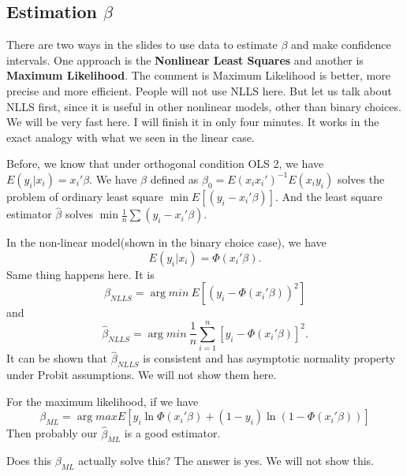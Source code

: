 \documentclass[11pt,a4paper]{amsart}
\theoremstyle{plain}
\theoremstyle{definition}
\begin{document}
\subsection{Estimation $\beta$}
	There are two ways in the slides to use data to estimate $\beta$ and make confidence intervals. One approach is the \textbf{Nonlinear Least Squares} and another is \textbf{Maximum Likelihood}. The comment is Maximum Likelihood is better, more precise and more efficient. People will not use NLLS here. But let us talk about NLLS first, since it is useful in other nonlinear models, other than binary choices. We will be very fast here. I will finish it in only four minutes. It works in the exact analogy with what we seen in the linear case.\par 
	Before, we know that under orthogonal condition OLS 2, we have $E(y_{i}|x_{i}) = x_{i}'\beta$. We have $\beta$ defined as $\beta_{0} = E(x_{i}x_{i}')^{-1}E(x_{i}y_{i})$ solves the problem of ordinary least square 
	$\min E[(y_{i} - x_{i}'\beta)]$. And the least square estimator $\hat{\beta}$ solves $\min \frac{1}{n}\sum(y_{i} - x_{i}'\beta)$. \par 
	In the non-linear model(shown in the binary choice case), we have 
	\[	E(y_{i}|x_{i}) = \Phi(x_{i}'\beta).	\] 
	Same thing happens here. It is 
	\[	\beta_{NLLS} = \arg min ~ E[(y_{i}-\Phi(x_{i}'\beta))^{2}]	\]
	and
	\[	\hat{\beta}_{NLLS} = \arg min ~ \frac{1}{n}\sum_{i=1}^{n}[y_{i}-\Phi(x_{i}'\beta)]^{2}.	\]
	It can be shown that $\hat{\beta}_{NLLS}$ is consistent and has asymptotic normality property under Probit assumptions. We will not show them here. \par 
	For the maximum likelihood, if we have 
	\[	\beta_{ML} = \arg max E[y_{i}\ln \Phi(x_{i}'\beta) + (1-y_{i})\ln(1-\Phi(x_{i}'\beta))]	\] 
	Then probably our $\hat{\beta}_{ML}$ is a good estimator.\par 
	Does this $	\beta_{ML} $ actually solve this? The answer is yes. We will not show this.
\end{document}
